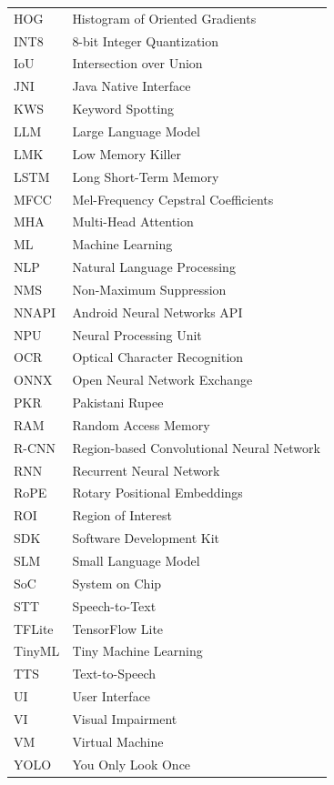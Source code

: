 \documentclass[12pt,a4paper]{report}
\begin{document}
\begin{longtable}{p{6cm} p{9.5cm}}
HOG     & Histogram of Oriented Gradients \\
INT8    & 8-bit Integer Quantization \\
IoU     & Intersection over Union \\
JNI     & Java Native Interface \\
KWS     & Keyword Spotting \\
LLM     & Large Language Model \\
LMK     & Low Memory Killer \\
LSTM    & Long Short-Term Memory \\
MFCC    & Mel-Frequency Cepstral Coefficients \\
MHA     & Multi-Head Attention \\
ML      & Machine Learning \\
NLP     & Natural Language Processing \\
NMS     & Non-Maximum Suppression \\
NNAPI   & Android Neural Networks API \\
NPU     & Neural Processing Unit \\
OCR     & Optical Character Recognition \\
ONNX    & Open Neural Network Exchange \\
PKR     & Pakistani Rupee \\
RAM     & Random Access Memory \\
R-CNN   & Region-based Convolutional Neural Network \\
RNN     & Recurrent Neural Network \\
RoPE    & Rotary Positional Embeddings \\
ROI     & Region of Interest \\
SDK     & Software Development Kit \\
SLM     & Small Language Model \\
SoC     & System on Chip \\
STT     & Speech-to-Text \\
TFLite  & TensorFlow Lite \\
TinyML  & Tiny Machine Learning \\
TTS     & Text-to-Speech \\
UI      & User Interface \\
VI      & Visual Impairment \\
VM      & Virtual Machine \\
YOLO    & You Only Look Once \\
\end{longtable}
 
\end{document}
